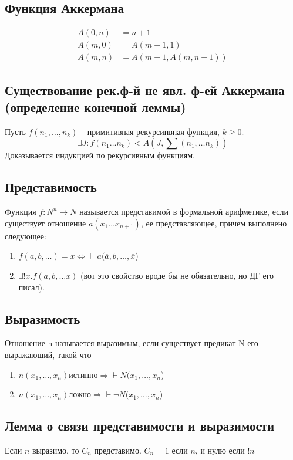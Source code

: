 \subsection{Функция Аккермана}
\label{sec-2-22}
\begin{align*}
    A(0, n) &= n + 1 \\
    A(m, 0) &= A(m - 1, 1) \\
    A(m, n) &= A(m - 1, A(m, n - 1))
\end{align*}
\subsection{Существование рек.ф-й не явл. ф-ей Аккермана (определение конечной леммы)}
\label{sec-2-23}
Пусть $f(n_1,\dotsc,n_k)$ -- примитивная рекурсинвная функция, $k \ge 0$.
\[\exists J:f(n_1\ldots{}n_k)<A(J, \sum(n_1,\ldots{}n_k))\]
Доказывается индукцией по рекурсивным функциям.
\subsection{Представимость}
\label{sec-2-24}
Функция $f:N^n\to N$ называется представимой в формальной арифметике, если
существует отношение $a(x_1\ldots{}x_{n+1})$, ее представляющее, причем выполнено
следующее:
\begin{enumerate}
\item $f(a,b,\ldots{}) = x \Leftrightarrow \vdash a(\overline a, \overline b,\dotsc, \overline x$)
\item $\exists !x.f(a,b,\ldots{}x)$ (вот это свойство вроде бы не обязательно, но ДГ его писал).
\end{enumerate}
\subsection{Выразимость}
\label{sec-2-25}
Отношение n называется выразимым, если существует предикат N его
выражающий, такой что
\begin{enumerate}
    \item $n(x_1, \dotsc, x_n) \text{истинно} \Rightarrow \vdash N(\overline{x_1}, \dotsc, \overline{x_n}$)
    \item $n(x_1, \dotsc, x_n) \text{ложно} \Rightarrow \vdash \lnot N(\overline{x_1}, \dotsc, \overline{x_n}$)
\end{enumerate}
\subsection{Лемма о связи представимости и выразимости}
\label{sec-2-26}
Если $n$ выразимо, то $C_n$ представимо.
$C_n = 1$ если $n$, и нулю если $!n$
